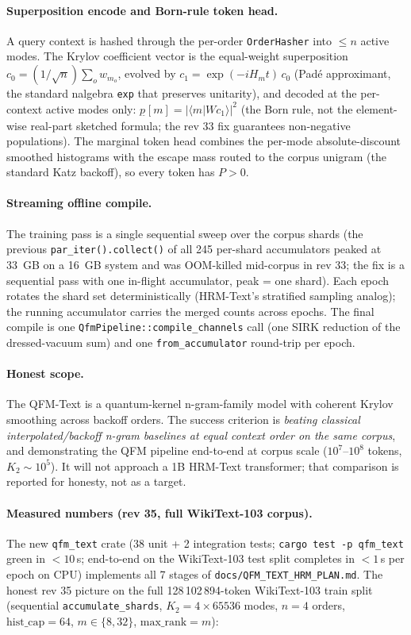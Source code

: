 \documentclass[11pt, a4paper]{article}
\begin{document}
\paragraph{Superposition encode and Born-rule token head.} A query
context is hashed through the per-order \texttt{OrderHasher} into
$\le n$ active modes. The Krylov coefficient vector is the
equal-weight superposition $c_0 = (1/\sqrt{n})\sum_o w_{m_o}$,
evolved by $c_1 = \exp(-iH_m t)\,c_0$ (Pad\'e approximant, the
standard nalgebra \texttt{exp} that preserves unitarity), and
decoded at the per-context active modes only:
$p_{\tilde{}}[m] = |\langle m|W c_1\rangle|^2$ (the Born rule, not
the element-wise real-part sketched formula; the rev 33 fix
guarantees non-negative populations). The marginal token head
combines the per-mode absolute-discount smoothed histograms with
the escape mass routed to the corpus unigram (the standard Katz
backoff), so every token has $P>0$.

\paragraph{Streaming offline compile.} The training pass is a
single sequential sweep over the corpus shards (the previous
\texttt{par\_iter().collect()} of all 245 per-shard accumulators
peaked at 33~GB on a 16~GB system and was OOM-killed mid-corpus in
rev 33; the fix is a sequential pass with one in-flight
accumulator, peak = one shard). Each epoch rotates the shard set
deterministically (HRM-Text's stratified sampling analog); the
running accumulator carries the merged counts across epochs. The
final compile is one \texttt{QfmPipeline::compile\_channels} call
(one SIRK reduction of the dressed-vacuum sum) and one
\texttt{from\_accumulator} round-trip per epoch.

\paragraph{Honest scope.} The QFM-Text is a quantum-kernel
n-gram-family model with coherent Krylov smoothing across backoff
orders. The success criterion is \emph{beating classical
interpolated/backoff n-gram baselines at equal context order on
the same corpus}, and demonstrating the QFM pipeline end-to-end at
corpus scale ($10^7$--$10^8$ tokens, $K_2\sim10^5$). It will not
approach a 1B HRM-Text transformer; that comparison is reported
for honesty, not as a target.

\paragraph{Measured numbers (rev 35, full WikiText-103
corpus).} The new \texttt{qfm\_text} crate (38 unit + 2 integration
tests; \texttt{cargo test -p qfm\_text} green in $<10$\,s; end-to-end
on the WikiText-103 test split completes in $<1$\,s per epoch on
CPU) implements all 7 stages of
\texttt{docs/QFM\_TEXT\_HRM\_PLAN.md}. The honest
rev 35 picture on the full 128\,102\,894-token WikiText-103 train
split (sequential \texttt{accumulate\_shards}, $K_2=4\times65536$
modes, $n=4$ orders, $\mathrm{hist\_cap}=64$, $m\in\{8,32\}$,
$\mathrm{max\_rank}=m$):
\end{document}
